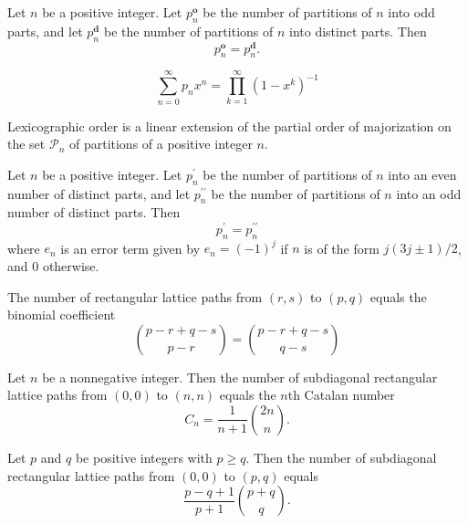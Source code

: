 \begin{theorem}
  \label{thm:8.3.3}
  Let $n$ be a positive integer. Let $p_n^{\textbf{o}}$ be the number of partitions of $n$ into odd
  parts, and let $p_n^{\textbf{d}}$ be the number of partitions of $n$ into distinct parts. Then
  \[ p_n^{\textbf{o}} = p_n^{\textbf{d}}. \]
\end{theorem}

\begin{theorem}
  \label{thm:8.3.4}
  \[ \sum\limits_{n=0}^{\infty}p_nx^n = \prod\limits_{k=1}^{\infty}(1-x^k)^{-1} \]
\end{theorem}

\begin{theorem}
  \label{thm:8.3.5}
  Lexicographic order is a linear extension of the partial order of majorization on the set 
  $\mathcal{P}_n$ of partitions of a positive integer $n$.
\end{theorem}

\begin{theorem}
  \label{thm:8.3.6}
  Let $n$ be a positive integer. Let $p_n^{\prime}$ be the number of partitions of $n$ into an even 
  number of distinct parts, and let $p_n^{\prime\prime}$ be the number of partitions of $n$ into an 
  odd number of distinct parts. Then
  \[ p_n^{\prime} = p_n^{\prime\prime} \]
  where $e_n$ is an error term given by $e_n = (-1)^j$ if $n$ is of the form $j(3j\pm 1)/2$, and 0 
  otherwise.
\end{theorem}

\begin{theorem}
  \label{thm:8.5.1}
  The number of rectangular lattice paths from $(r, s)$ to $(p, q)$ equals the binomial coefficient
  \[ \binom{p-r+q-s}{p-r} = \binom{p-r+q-s}{q-s} \]
\end{theorem}

\begin{theorem}
  \label{thm:8.5.2}
  Let $n$ be a nonnegative integer. Then the number of subdiagonal rectangular lattice paths from 
  $(0,0)$ to $(n, n)$ equals the $n$th Catalan number
  \[ C_n = \frac{1}{n+1}\binom{2n}{n}. \]
\end{theorem}

\begin{theorem}
  \label{thm:8.5.3}
  Let $p$ and $q$ be positive integers with $p \geq q$. Then the number of subdiagonal rectangular 
  lattice paths from $(0,0)$ to $(p, q)$ equals
  \[ \frac{p-q+1}{p+1}\binom{p+q}{q}. \]
\end{theorem}

